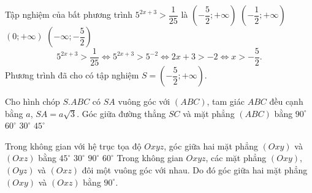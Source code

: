 \begin{ex}%
Tập nghiệm của bất phương trình $5^{2x+3}>\dfrac{1}{25}$ là
\choice 
{\True $\left (-\dfrac{5}{2};+\infty  \right )$} 
{$\left (-\dfrac{1}{2};+\infty  \right )$}
{$(0;+\infty )$} 
{$\left (-\infty ;-\dfrac{5}{2} \right )$}
\loigiai
{
$$5^{2x+3}>\dfrac{1}{25}\Leftrightarrow 5^{2x+3}>5^{-2}\Leftrightarrow 2x+3>-2\Leftrightarrow x>-\dfrac{5}{2}.$$
Phương trình đã cho có tập nghiệm $S=\left (-\dfrac{5}{2};+\infty  \right )$.
}
\end{ex}

\begin{ex}%
Cho hình chóp $S.ABC$ có $SA$ vuông góc với $(ABC)$, tam giác $ABC$ đều cạnh bằng $a$, $SA=a\sqrt{3}$. Góc giữa đường thẳng $SC$ và mặt phẳng $(ABC)$ bằng
\choice 
{$90^{\circ}$} 
{\True $60^{\circ}$}
{$30^{\circ}$} 
{$45^{\circ}$}
\loigiai
{
}
\end{ex}

\begin{ex}%
Trong không gian với hệ trục tọa độ $Oxyz$, góc giữa hai mặt phẳng $(Oxy)$ và $(Oxz)$ bằng
\choice 
{$45^{\circ}$} 
{$30^{\circ}$}
{\True $90^{\circ}$} 
{$60^{\circ}$}
\loigiai
{
Trong không gian $Oxyz$, các mặt phẳng $(Oxy)$, $(Oyz)$ và $(Oxz)$ đôi một vuông góc với nhau. Do đó góc giữa hai mặt phẳng $(Oxy)$ và $(Oxz)$ bằng $90^{\circ}$.
}
\end{ex}

